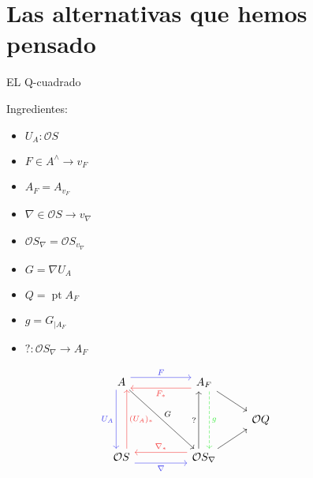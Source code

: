 \documentclass[compress,12pt]{beamer}
\DeclareMathOperator{\pt}{pt}
\begin{document}
\section{Las alternativas que hemos pensado}
\begin{frame}[fragile]{EL Q-cuadrado}
	\begin{block}{Ingredientes:}
		\begin{multicols}{3}
		
		 \begin{itemize}
			\item $U_A\colon \mathcal{O}S$
			\item $F\in A^\wedge \rightarrow v_F$
			\item $A_F=A_{v_F}$
			\item $\nabla\in \mathcal{O}S \rightarrow v_\nabla$
			\item $\mathcal{O}S_\nabla=\mathcal{O}S_{v_\nabla}$
			\item $G=\nabla U_A$
			\item $Q=\pt A_F$
			\item $g=G_{\mid A_F}$
			\item $?\colon \mathcal{O}S_\nabla\to A_F$
		 \end{itemize}
		
		\end{multicols}
	\end{block}
\[\begin{tikzcd}
	A && {A_F} && {} \\
	&&& {\mathcal{O}Q} \\
	{\mathcal{O}S} && {\mathcal{O}S_\nabla}
	\arrow["F", shift left=2, color={rgb,255:red,67;green,67;blue,239}, from=1-1, to=1-3]
	\arrow["{U_A}"', shift right=2, color={rgb,255:red,67;green,67;blue,239}, from=1-1, to=3-1]
	\arrow["G", from=1-1, to=3-3]
	\arrow["{F_*}", shift left=2, color={rgb,255:red,245;green,61;blue,61}, from=1-3, to=1-1]
	\arrow[from=1-3, to=2-4]
	\arrow["g", shift left=2, color={rgb,255:red,69;green,237;blue,72}, dashed, from=1-3, to=3-3]
	\arrow["{(U_A)_*}"', shift right=2, color={rgb,255:red,245;green,61;blue,61}, from=3-1, to=1-1]
	\arrow["\nabla"', shift right=2, color={rgb,255:red,67;green,67;blue,239}, from=3-1, to=3-3]
	\arrow["{?}", shift left=2, from=3-3, to=1-3]
	\arrow[from=3-3, to=2-4]
	\arrow["{\nabla_*}"', shift right=2, color={rgb,255:red,245;green,61;blue,61}, from=3-3, to=3-1]
\end{tikzcd}\]
\end{frame}
\end{document}
